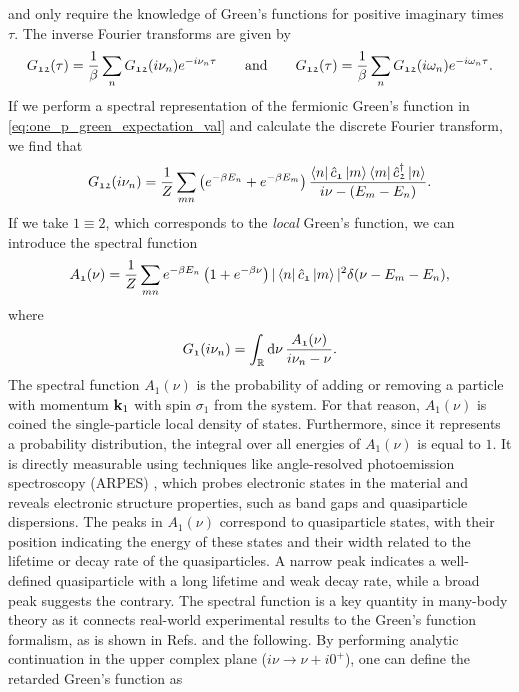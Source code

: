 \documentclass[../../main.tex]{subfiles}
\begin{document}
and only require the knowledge of Green's functions for positive imaginary times $\tau$. The inverse Fourier transforms are given by
\begin{align}
	G_{\mathfrak{12}}(\tau)=\frac1\beta \sum_n G_{\mathfrak{12}}(i\nu_n) e^{-i\nu_n\tau} \qquad\text{and}\qquad G_{\mathfrak{12}}(\tau)=\frac1\beta \sum_n G_{\mathfrak{12}}(i\omega_n) e^{-i\omega_n\tau}.
\end{align}
If we perform a spectral representation of the fermionic Green's function in \eqref{eq:one_p_green_expectation_val} and calculate the discrete Fourier transform, we find that
\begin{align}
	G_{\mathfrak{12}}(i\nu_n)=\frac1Z\sum_{mn}\left (e^{-\beta E_n}+e^{-\beta E_m}\right )\frac{\bra{n} \hat c_{\mathfrak{1}} \ket{m}\bra{m} \hat c^{\dagger}_{\mathfrak{2}} \ket{n}}{i\nu-(E_m-E_n)}.
\end{align}
If we take $\mathfrak{1}\equiv \mathfrak{2}$, which corresponds to the \textit{local} Green's function, we can introduce the spectral function
\begin{align}
	A_{\mathfrak{1}}(\nu)=\frac1Z\sum_{mn} e^{-\beta E_n}\left (1+e^{-\beta\nu}\right ) |\bra{n} \hat c_{\mathfrak{1}} \ket{m}|^2 \delta(\nu-E_m-E_n),
\end{align}
where
\begin{align}
	G_{\mathfrak{1}}(i\nu_n)=\int_{\mathbb{R}}^{}\text{d}\nu\,\frac{A_{\mathfrak{1}}(\nu)}{i\nu_n-\nu}.
\end{align}
The spectral function $A_{\mathfrak{1}}(\nu)$ is the probability of adding or removing a particle with momentum $\textbf{k}_1$ with spin $\sigma_1$ from the system. For that reason, $A_{\mathfrak{1}}(\nu)$ is coined the single-particle local density of states. Furthermore, since it represents a probability distribution, the integral over all energies of $A_{\mathfrak{1}}(\nu)$ is equal to $1$. It is directly measurable using techniques like angle-resolved photoemission spectroscopy (ARPES) \cite{Quasiparticle spectral function, full momentum and energy resolved}, which probes electronic states in the material and reveals electronic structure properties, such as band gaps and quasiparticle dispersions. The peaks in $A_{\mathfrak{1}}(\nu)$ correspond to quasiparticle states, with their position indicating the energy of these states and their width related to the lifetime or decay rate of the quasiparticles. A narrow peak indicates a well-defined quasiparticle with a long lifetime and weak decay rate, while a broad peak suggests the contrary. The spectral function is a key quantity in many-body theory as it connects real-world experimental results to the Green's function formalism, as is shown in Refs. \cite{Quasiparticle spectral function, full momentum and energy resolved} and the following. By performing analytic continuation in the upper complex plane ($i\nu\to\nu+i0^{+}$), one can define the retarded Green's function as
\end{document}
